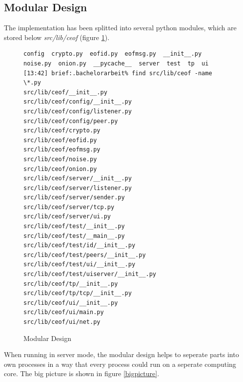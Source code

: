 \subsection{Modular Design}
The implementation has been splitted into several python
modules, which are stored below \textit{src/lib/ceof} 
(figure \ref{pythonmodules}).
\begin{figure}[htbp][htb]
\caption{Modular Design}
\label{pythonmodules}
\begin{verbatim}
config  crypto.py  eofid.py  eofmsg.py  __init__.py  noise.py  onion.py  __pycache__  server  test  tp  ui
[13:42] brief:.bachelorarbeit% find src/lib/ceof -name \*.py
src/lib/ceof/__init__.py
src/lib/ceof/config/__init__.py
src/lib/ceof/config/listener.py
src/lib/ceof/config/peer.py
src/lib/ceof/crypto.py
src/lib/ceof/eofid.py
src/lib/ceof/eofmsg.py
src/lib/ceof/noise.py
src/lib/ceof/onion.py
src/lib/ceof/server/__init__.py
src/lib/ceof/server/listener.py
src/lib/ceof/server/sender.py
src/lib/ceof/server/tcp.py
src/lib/ceof/server/ui.py
src/lib/ceof/test/__init__.py
src/lib/ceof/test/__main__.py
src/lib/ceof/test/id/__init__.py
src/lib/ceof/test/peers/__init__.py
src/lib/ceof/test/ui/__init__.py
src/lib/ceof/test/uiserver/__init__.py
src/lib/ceof/tp/__init__.py
src/lib/ceof/tp/tcp/__init__.py
src/lib/ceof/ui/__init__.py
src/lib/ceof/ui/main.py
src/lib/ceof/ui/net.py
\end{verbatim}
\end{figure}
When running in server mode, the modular design helps
to seperate parts into own processes in a way that
every process could run on a seperate computing
core. The big picture is shown in figure \ref{bigpicture}.
